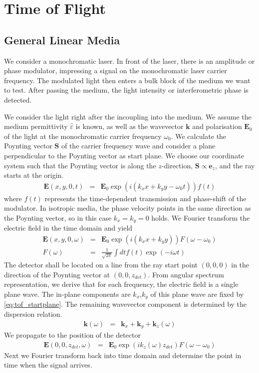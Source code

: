 \documentclass[12pt,a4paper,twoside,openright,BCOR10mm,headsepline,titlepage,abstracton,chapterprefix,final]{scrreprt}
\newcommand\Vector[1]{{\mathbf{#1}}}
\newcommand\wavenumber{k}
\newcommand\Wavevector{\Vector{\wavenumber}}
\newcommand\Tensor[1]{\hat{#1}}
\newcommand\scalarEfield{E}
\newcommand\Efield{\Vector{\scalarEfield}}
\newcommand\permittivity{\Tensor{\scalarpermittivity}}
\newcommand\scalarpermittivity{\varepsilon}
\begin{document}
\section{Time of Flight}
\subsection{General Linear Media}
We consider a monochromatic laser. 
In front of the laser, there is an amplitude or phase modulator, impressing a signal on the monochromatic laser carrier frequency.
The modulated light then enters a bulk block of the medium we want to test.
After passing the medium, the light intensity or interferometric phase is detected.

We consider the light right after the incoupling into the medium.
We assume the medium permittivity $\permittivity$ is known,
as well as the wavevector $\Wavevector$ and polarisation $\Efield_0$ of the light at the monochromatic carrier frequency $\omega_0$.
We calculate the Poynting vector $\Vector{S}$ of the carrier frequency wave 
and consider a plane perpendicular to the Poynting vector as start plane.
We choose our coordinate system such that the Poynting vector is along the $z$-direction, $\Vector{S} \propto \Vector{e}_z$,
and the ray starts at the origin.
\begin{eqnarray}
 \Efield(x,y,0, t) &=& \Efield_0 \exp (i ( \wavenumber_x x + \wavenumber_y y - \omega_0 t)) f(t)
\end{eqnarray}
where $f(t)$ represents the time-dependent transmission and phase-shift of the modulator.
In isotropic media, the phase velocity points in the same direction as the Poynting vector, 
so in this case $\wavenumber_x = \wavenumber_y = 0$ holds.
We Fourier transform the electric field in the time domain and yield
\begin{eqnarray}
 \Efield(x,y,0, \omega) &=& \Efield_0  \exp (i ( \wavenumber_x x+ \wavenumber_y y)) F(\omega-\omega_0) \label{eq:tof_startplane}\\
 F(\omega) &=& \frac{1}{\sqrt{2\pi}} \int dt f(t) \exp(-i \omega t)
\end{eqnarray}
The detector shall be located on a line from the ray start point $(0,0,0)$ in the direction of the Poynting vector at $(0,0,z_{det})$.
From angular spectrum representation, we derive that for each frequency, the electric field is a single plane wave.
The in-plane components are $\wavenumber_x$,$\wavenumber_y$ of this plane wave are fixed by \eqref{eq:tof_startplane}.
The remaining wavevector component is determined by the dispersion relation.
\begin{eqnarray}
 \Wavevector(\omega) &=& \Wavevector_x + \Wavevector_y + \Wavevector_z(\omega)
\end{eqnarray}
We propagate to the position of the detector
\begin{eqnarray}
\Efield(0, 0, z_{det}, \omega) &=& \Efield_0  \exp (i \wavenumber_z(\omega) z_{det}) F(\omega-\omega_0) 
\end{eqnarray}
Next we Fourier transform back into time domain and determine the point in time when the signal arrives.
\end{document}
